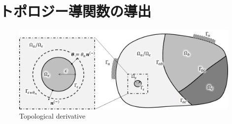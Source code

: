 \section{トポロジー導関数の導出}

\begin{figure}[ht]
	\begin{center}
		\includegraphics[width=13cm]{./figures/SDforTD.png}
		\caption{Topological derivative}
		\label{fig:TD}
	\end{center}
\end{figure}


